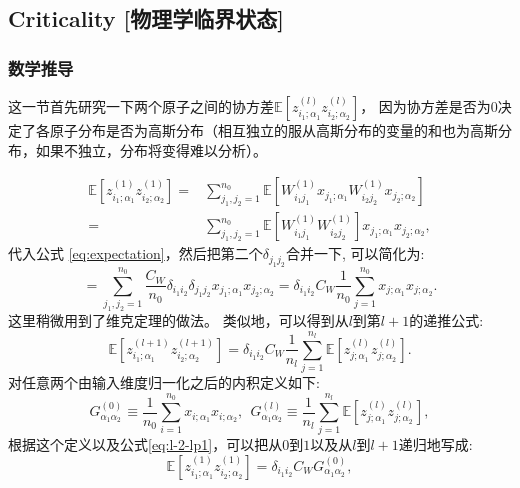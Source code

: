 \subsection{Criticality [物理学临界状态]}

\subsubsection{数学推导}
这一节首先研究一下两个原子之间的协方差$\mathbb{E}[z_{i_1;\alpha_1}^{(l)}z_{i_2;\alpha_2}^{(l)}]$，
因为协方差是否为$0$决定了各原子分布是否为高斯分布（相互独立的服从高斯分布的变量的和也为高斯分布，如果不独立，分布将变得难以分析）。

\begin{equation*}
    \begin{aligned}
   \mathbb{E} [z_{i_1;\alpha_1}^{(1)}z_{i_2;\alpha_2}^{(1)}] =& \sum_{j_1,j_2=1}^{n_0} 
            \mathbb{E} [W_{i_1j_1}^{(1)}x_{j_1;\alpha_1}W_{i_2j_2}^{(1)}x_{j_2;\alpha_2}] \\
    =& \sum_{j_1,j_2=1}^{n_0} \mathbb{E} [W_{i_1j_1}^{(1)}W_{i_2j_2}^{(1)}]x_{j_1;\alpha_1}x_{j_2;\alpha_2},
    \end{aligned}
\end{equation*}
代入公式 \ref{eq:expectation}，然后把第二个$\delta_{j_1j_2}$合并一下, 可以简化为:
\begin{equation*}
             = \sum_{j_1,j_2=1}^{n_0} \frac{C_W}{n_0} 
             \delta_{i_1i_2}\delta_{j_1j_2}x_{j_1;\alpha_1}x_{j_2;\alpha_2}
             = \delta_{i_1i_2}C_W \frac{1}{n_0}\sum_{j=1}^{n_0}x_{j;\alpha_1}x_{j;\alpha_2}.
\end{equation*}
这里稍微用到了维克定理的做法。
类似地，可以得到从$l$到第$l+1$的递推公式:
\begin{equation}
    \mathbb{E}[z_{i_1;\alpha_1}^{(l+1)} z_{i_2;\alpha_2}^{(l+1)}] = 
        \delta_{i_1i_2}C_W \frac{1}{n_l}\sum_{j=1}^{n_l}\mathbb{E} 
            [z_{j;\alpha_1}^{(l)}z_{j;\alpha_2}^{(l)}].
    \label{eq:l-2-lp1}
\end{equation}
对任意两个由输入维度归一化之后的内积定义如下:
\begin{equation*}
    G_{\alpha_1\alpha_2}^{(0)} \equiv \frac{1}{n_0} \sum_{i=1}^{n_0} x_{i;\alpha_1}x_{i;\alpha_2}, ~~
    G_{\alpha_1\alpha_2}^{(l)} \equiv \frac{1}{n_l} \sum_{j=1}^{n_l} 
        \mathbb{E}[z_{j;\alpha_1}^{(l)}z_{j;\alpha_2}^{(l)}],
    \label{eq:2corr-def}
\end{equation*}
根据这个定义以及公式\ref{eq:l-2-lp1}，可以把从$0$到$1$以及从$l$到$l+1$递归地写成:
\begin{equation}
    \mathbb{E}[z_{i_1;\alpha_1}^{(1)}z_{i_2;\alpha_2}^{(1)}] = \delta_{i_1i_2}C_W G_{\alpha_1\alpha_2}^{(0)},
\end{equation}
